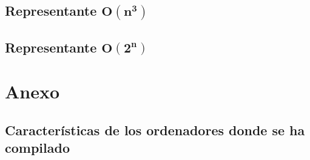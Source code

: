 \documentclass[11pt]{article}
\begin{document}
\subsection*{Representante $\boldsymbol{O(n^3)}$}

\subsection*{Representante $\boldsymbol{O(2^n)}$}






\section*{Anexo}
\subsection*{Características de los ordenadores donde se ha compilado}
\end{document}
